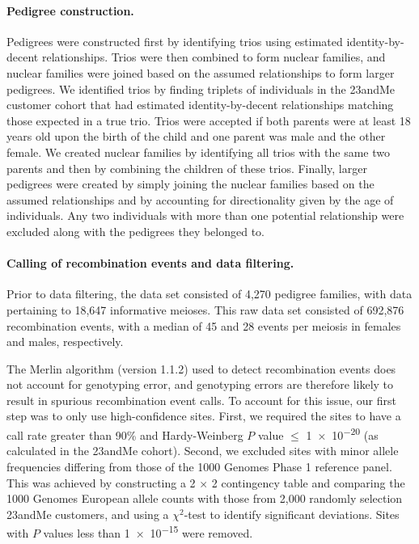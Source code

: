 \paragraph{Pedigree construction.} Pedigrees were constructed first by identifying trios using
estimated identity-by-decent relationships. Trios were then combined to form
nuclear families, and nuclear families were joined based on the assumed
relationships to form larger pedigrees. We identified trios by finding triplets of
individuals in the 23andMe customer cohort that had estimated identity-by-decent
relationships matching those expected in a true trio. Trios were accepted if both
parents were at least 18 years old upon the birth of the child and one parent was
male and the other female. We created nuclear families by identifying all trios with
the same two parents and then by combining the children of these trios. Finally,
larger pedigrees were created by simply joining the nuclear families based on the
assumed relationships and by accounting for directionality given by the age of
individuals. Any two individuals with more than one potential relationship were
excluded along with the pedigrees they belonged to.

\paragraph{Calling of recombination events and data filtering.} Prior to data filtering,
the data set consisted of 4,270 pedigree families, with data pertaining to 18,647
informative meioses. This raw data set consisted of 692,876 recombination events,
with a median of 45 and 28 events per meiosis in females and males, respectively.

The Merlin algorithm (version 1.1.2) used to detect recombination events does
not account for genotyping error, and genotyping errors are therefore likely to
result in spurious recombination event calls. To account for this issue, our first step
was to only use high-confidence sites. First, we required the sites to have a call rate
greater than 90\% and Hardy-Weinberg $P$ value $\le$ \num{1e-20} (as calculated in the
23andMe cohort). Second, we excluded sites with minor allele frequencies differing
from those of the 1000 Genomes Phase 1 reference panel\cite{1000G2012}. This was achieved by
constructing a 2 $\times$ 2 contingency table and comparing the 1000 Genomes
European allele counts with those from 2,000 randomly selection 23andMe
customers, and using a $\chi^2$-test to identify significant deviations. Sites with $P$ values
less than \num{1e-15} were removed.

